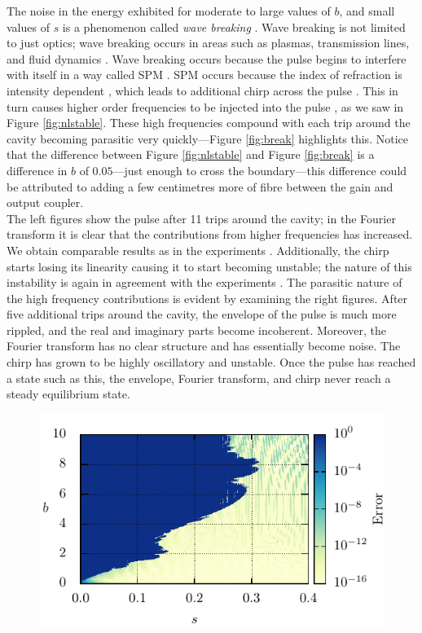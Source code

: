 \documentclass[10pt,twocolumn,a4paper]{article}
\begin{document}
The noise in the energy exhibited for moderate to large values of $b$, and small values of $s$ is a phenomenon called \emph{wave breaking} \cite{agrawal2013, anderson, finot, rothenberg, tomlinson}. Wave breaking is not limited to just optics; wave breaking occurs in areas such as plasmas, transmission lines, and fluid dynamics \cite{rothenberg}. Wave breaking occurs because the pulse begins to interfere with itself in a way called SPM \cite{agrawal2002, agrawal2013, becker}. SPM occurs because the index of refraction is intensity dependent \cite{agrawal2002, becker, rothenberg, silfvast}, which leads to additional chirp across the pulse \cite{agrawal2013, anderson, rothenberg, silfvast}. This in turn causes higher order frequencies to be injected into the pulse \cite{agrawal2013, anderson}, as we saw in Figure \ref{fig:nlstable}. These high frequencies compound with each trip around the cavity becoming parasitic very quickly---Figure \ref{fig:break} highlights this. Notice that the difference between Figure \ref{fig:nlstable} and Figure \ref{fig:break} is a difference in $b$ of $0.05$---just enough to cross the boundary---this difference could be attributed to adding a few centimetres more of fibre between the gain and output coupler. \\

The left figures show the pulse after 11 trips around the cavity; in the Fourier transform it is clear that the contributions from higher frequencies has increased. We obtain comparable results as in the experiments \cite{anderson, rothenberg}. Additionally, the chirp starts losing its linearity causing it to start becoming unstable; the nature of this instability is again in agreement with the experiments \cite{anderson, rothenberg}. The parasitic nature of the high frequency contributions is evident by examining the right figures. After five additional trips around the cavity, the envelope of the pulse is much more rippled, and the real and imaginary parts become incoherent. Moreover, the Fourier transform has no clear structure and has essentially become noise. The chirp has grown to be highly oscillatory and unstable. Once the pulse has reached a state such as this, the envelope, Fourier transform, and chirp never reach a steady equilibrium state.


\begin{figure}[htbp]
	\centering
	\includegraphics{ParamSpaceErr}
	\caption{}
	\label{fig:error}
\end{figure}
\end{document}
